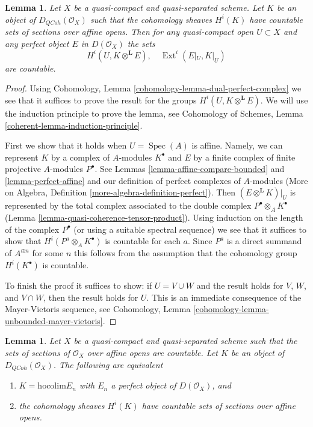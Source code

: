 \documentclass{stacks-project}
\theoremstyle{plain}
\newtheorem{lemma}[subsection]{Lemma}
\theoremstyle{definition}
\theoremstyle{remark}
\numberwithin{equation}{subsection}
\def\Spec{\mathop{\mathrm{Spec}}}
\def\Ext{\mathop{\mathrm{Ext}}\nolimits}
\def\QCoh{\mathit{QCoh}}
\begin{document}
\begin{lemma}
\label{lemma-countable-cohomology}
Let $X$ be a quasi-compact and quasi-separated scheme.
Let $K$ be an object of $D_\QCoh(\mathcal{O}_X)$
such that the cohomology sheaves $H^i(K)$ have countable
sets of sections over affine opens. Then for any quasi-compact open
$U \subset X$ and any perfect object $E$ in $D(\mathcal{O}_X)$
the sets
$$
H^i(U, K \otimes^\mathbf{L} E),\quad \Ext^i(E|_U, K|_U)
$$
are countable.
\end{lemma}

\begin{proof}
Using Cohomology, Lemma \ref{cohomology-lemma-dual-perfect-complex}
we see that it suffices to prove the result
for the groups $H^i(U, K \otimes^\mathbf{L} E)$.
We will use the induction principle to prove the lemma, see
Cohomology of Schemes, Lemma \ref{coherent-lemma-induction-principle}.

\medskip\noindent
First we show that it holds when $U = \Spec(A)$ is affine. Namely, we can
represent $K$ by a complex of $A$-modules $K^\bullet$ and $E$ by a
finite complex of finite projective $A$-modules $P^\bullet$.
See Lemmas \ref{lemma-affine-compare-bounded} and
\ref{lemma-perfect-affine}
and our definition of perfect complexes of $A$-modules
(More on Algebra, Definition \ref{more-algebra-definition-perfect}).
Then $(E \otimes^\mathbf{L} K)|_U$ is represented by
the total complex associated to the double complex
$P^\bullet \otimes_A K^\bullet$
(Lemma \ref{lemma-quasi-coherence-tensor-product}).
Using induction on the length of the complex
$P^\bullet$ (or using a suitable spectral sequence)
we see that it suffices to show that
$H^i(P^a \otimes_A K^\bullet)$ is countable for each $a$.
Since $P^a$ is a direct summand of $A^{\oplus n}$ for
some $n$ this follows from the assumption that
the cohomology group $H^i(K^\bullet)$ is countable.

\medskip\noindent
To finish the proof it suffices to show: if $U = V \cup W$
and the result holds for $V$, $W$, and $V \cap W$, then
the result holds for $U$. This is an immediate consequence
of the Mayer-Vietoris sequence, see
Cohomology, Lemma \ref{cohomology-lemma-unbounded-mayer-vietoris}.
\end{proof}

\begin{lemma}
\label{lemma-countable}
Let $X$ be a quasi-compact and quasi-separated scheme such that
the sets of sections of $\mathcal{O}_X$ over affine opens are countable.
Let $K$ be an object of $D_\QCoh(\mathcal{O}_X)$. The
following are equivalent
\begin{enumerate}
\item $K = \text{hocolim} E_n$ with $E_n$ a perfect object of
$D(\mathcal{O}_X)$, and
\item the cohomology sheaves $H^i(K)$ have countable
sets of sections over affine opens.
\end{enumerate}
\end{lemma}
\end{document}
